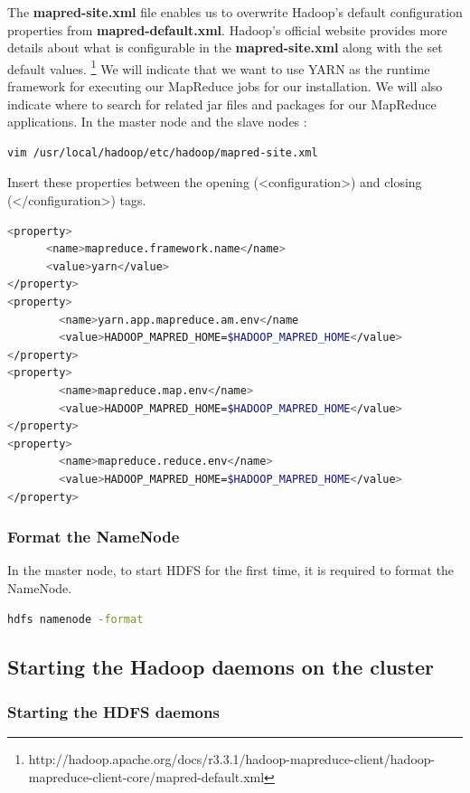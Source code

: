 \documentclass[12pt,english]{book}
\begin{document}
The \textbf{mapred-site.xml} file enables us to overwrite Hadoop's default configuration properties from \textbf{mapred-default.xml}.
Hadoop's official website provides more details about what is configurable in the \textbf{mapred-site.xml} along with the set default values.
\footnote{http://hadoop.apache.org/docs/r3.3.1/hadoop-mapreduce-client/hadoop-mapreduce-client-core/mapred-default.xml}
We will indicate that we want to use YARN as the runtime framework for executing our MapReduce jobs for our installation. We will also indicate where to search for related jar files and packages for our MapReduce applications.
In the master node and the slave nodes :
\begin{lstlisting}[language=bash, frame=single]
vim /usr/local/hadoop/etc/hadoop/mapred-site.xml 
\end{lstlisting}
Insert these properties between the opening (<configuration>) and closing (</configuration>) tags. 
\begin{lstlisting}[language=bash, frame=single]
<property>
      <name>mapreduce.framework.name</name>
      <value>yarn</value>
</property>
<property>
        <name>yarn.app.mapreduce.am.env</name
        <value>HADOOP_MAPRED_HOME=$HADOOP_MAPRED_HOME</value>
</property>
<property>
        <name>mapreduce.map.env</name>
        <value>HADOOP_MAPRED_HOME=$HADOOP_MAPRED_HOME</value>
</property>
<property>
        <name>mapreduce.reduce.env</name>
        <value>HADOOP_MAPRED_HOME=$HADOOP_MAPRED_HOME</value>
</property>
\end{lstlisting}


\subsubsection{Format the NameNode}


In the master node, to start HDFS for the first time, it is required to format the NameNode.
\begin{lstlisting}[language=bash, frame=single]
hdfs namenode -format
\end{lstlisting}


\subsection{Starting the Hadoop daemons on the cluster}


\subsubsection{Starting the HDFS daemons}
\end{document}
